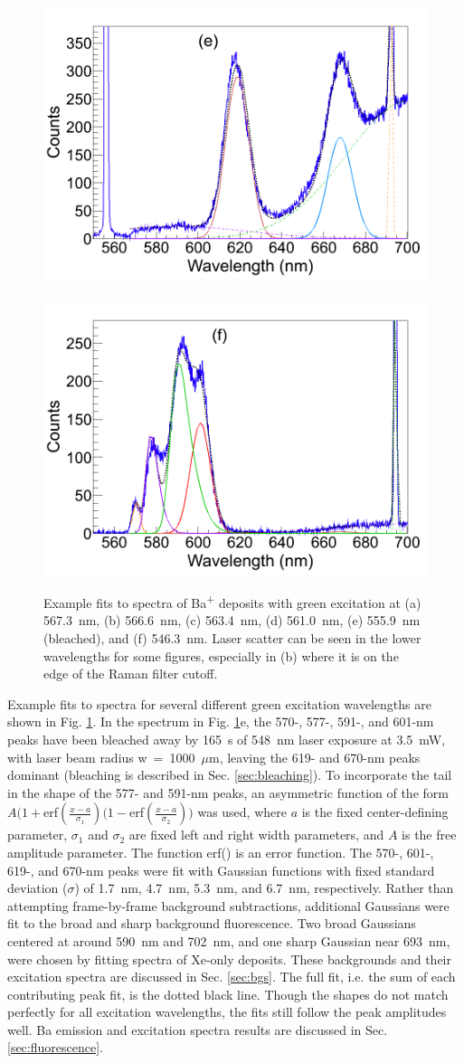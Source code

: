 \begin{figure}
                \includegraphics[width=.5\textwidth]{figures/spectra_fit_e.png}
                ~
                \includegraphics[width=.5\textwidth]{figures/spectra_fit_f.png}
                \caption{Example fits to spectra of Ba\textsuperscript{+} deposits with green excitation at (a) 567.3~nm, (b) 566.6~nm, (c) 563.4~nm, (d) 561.0~nm, (e) 555.9~nm (bleached), and (f) 546.3~nm.  Laser scatter can be seen in the lower wavelengths for some figures, especially in (b) where it is on the edge of the Raman filter cutoff.}
\label{fig:specFitsGrn}
\end{figure}

Example fits to spectra for several different green excitation wavelengths are shown in Fig. \ref{fig:specFitsGrn}.  In the spectrum in Fig. \ref{fig:specFitsGrn}e, the 570-, 577-, 591-, and 601-nm peaks have been bleached away by 165~s of 548~nm laser exposure at 3.5~mW, with laser beam radius w~=~1000~$\mu$m, leaving the 619- and 670-nm peaks dominant (bleaching is described in Sec. \ref{sec:bleaching}).  To incorporate the tail in the shape of the 577- and 591-nm peaks, an asymmetric function of the form $A(1+$erf$(\frac{x-a}{\sigma_{1}})(1-$erf$(\frac{x-a}{\sigma_{2}}))$ was used, where $a$ is the fixed center-defining parameter, $\sigma_{1}$ and $\sigma_{2}$ are fixed left and right width parameters, and $A$ is the free amplitude parameter.  The function erf() is an error function.  The 570-, 601-, 619-, and 670-nm peaks were fit with Gaussian functions with fixed standard deviation ($\sigma$) of 1.7~nm, 4.7~nm, 5.3~nm, and 6.7~nm, respectively.  Rather than attempting frame-by-frame background subtractions, additional Gaussians were fit to the broad and sharp background fluorescence.  Two broad Gaussians centered at around 590~nm and 702~nm, and one sharp Gaussian near 693~nm, were chosen by fitting spectra of Xe-only deposits.  These backgrounds and their excitation spectra are discussed in Sec. \ref{sec:bgs}.  The full fit, i.e. the sum of each contributing peak fit, is the dotted black line.  Though the shapes do not match perfectly for all excitation wavelengths, the fits still follow the peak amplitudes well.  Ba emission and excitation spectra results are discussed in Sec. \ref{sec:fluorescence}.

